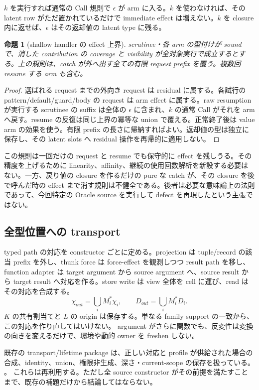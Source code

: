 \documentclass[11pt,a4paper]{article}
\newtheorem{theorem}{命題}[section]
\theoremstyle{remark}
\newcommand{\newsrc}[2]{\href{https://github.com/momota1029/yulang/blob/d5552b3e328e53c3a60170329cd2192e4e11c097/#1}{\detokenize{#2}}}
\begin{document}
$k$ を実行すれば通常の Call 規則で $\epsilon$ が arm に入る。$k$ を使わなければ、その latent row がただ置かれているだけで immediate effect は増えない。$k$ を closure 内に返せば、$\epsilon$ はその返却値の latent type に残る。

\begin{theorem}[shallow handler の effect 上界]
scrutinee・各 arm の型付けが sound で、消した contribution の coverage と visibility が全対象実行で成立するとする。上の規則は、catch が外へ出す全ての有限 request prefix を覆う。複数回 resume する arm も含む。
\end{theorem}
\begin{proof}
選ばれる request までの外向き request は residual に属する。各試行の pattern/default/guard/body の request は arm effect に属する。raw resumption が実行する scrutinee の suffix は全体の $\epsilon$ に含まれ、$k$ の通常 Call がそれを arm へ戻す。resume の反復は同じ上界の冪等な union で覆える。正常終了後は value arm の効果を使う。有限 prefix の長さに帰納すればよい。返却値の型は独立に保存し、その latent slots へ residual 操作を再帰的に適用しない。
\end{proof}

この規則は一回だけの request と resume でも保守的に effect を残しうる。その精度を上げるために linearity、affinity、継続の使用回数解析を新設する必要はない。一方、戻り値の closure を作るだけの pure な catch が、その closure を後で呼んだ時の effect まで消す規則は不健全である。後者は必要な意味論上の法則であって、今回特定の Oracle source を実行して defect を再現したという主張ではない。

\subsection{全型位置への transport}

typed path の対応を constructor ごとに定める。projection は tuple/record の該当 prefix を外し、thunk force は force-effect を観測しつつ result path を移し、function adapter は target argument から source argument へ、source result から target result へ対応を作る。store write は view 全体を cell に運び、read はその対応を合成する。
\[
\chi_{out}=\bigcup_i M_i^*\chi_i,\qquad
D_{out}=\bigcup_i M_i^*D_i.
\]
$K$ の共有割当てと $L$ の origin は保存する。単なる family support の一致から、この対応を作り直してはいけない。
argument がさらに関数でも、反変性は変換の向きを変えるだけで、環境や動的 owner を freshen しない。

既存の transport/lifetime package は、正しい対応と profile が供給された場合の合成、identity、union、権限非生成、深さ・current-scope の保存を扱っている。
\newsrc{notes/design/2026-10-02-typed-boundary-realization-draft.md\#L870-L968}{transport and lifetime lemmas}。
これらは再利用する。ただし全 source constructor がその前提を満たすことまで、既存の補題だけから結論してはならない。
\end{document}
